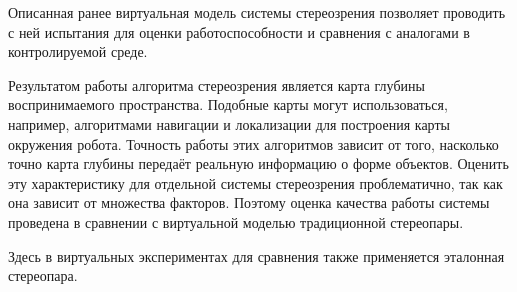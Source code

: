 Описанная ранее виртуальная модель системы стереозрения позволяет проводить 
с ней испытания для оценки работоспособности и сравнения с аналогами в контролируемой среде.           

Результатом работы алгоритма стереозрения является карта глубины воспринимаемого пространства. Подобные карты могут
использоваться, например, алгоритмами навигации и локализации для построения карты окружения робота. Точность работы 
этих алгоритмов зависит от того, насколько точно карта глубины передаёт реальную информацию о форме объектов. Оценить 
эту характеристику для отдельной системы стереозрения проблематично, так как она зависит от множества факторов.         %
Поэтому оценка качества работы системы проведена в сравнении с виртуальной моделью традиционной стереопары.

Здесь в виртуальных экспериментах для сравнения также применяется эталонная стереопара.  %
